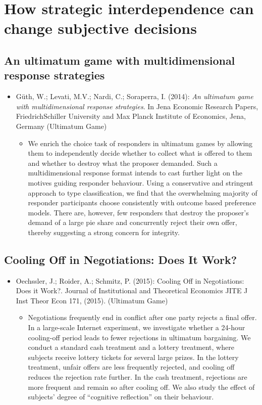 
\chapter{How strategic interdependence can change subjective decisions}

\section{An ultimatum game with multidimensional response strategies} 

\begin{itemize}
	\item Güth, W.; Levati, M.V.; Nardi, C.; Soraperra, I. (2014): \textit{An ultimatum game with multidimensional response strategies}. In Jena Economic Research Papers, FriedrichSchiller University and Max Planck Institute of Economics, Jena, Germany (Ultimatum Game)
		\begin{itemize}
			\item We enrich the choice task of responders in ultimatum games by allowing them to independently decide whether to collect what is offered to them and whether to destroy what the proposer demanded. Such a multidimensional response format intends to cast further light on the motives guiding responder behaviour. Using a conservative and stringent approach to type classification, we find that the overwhelming majority of responder participants choose consistently with outcome based preference models. There are, however, few responders that destroy the proposer's demand of a large pie share and concurrently reject their own offer, thereby suggesting a strong concern for integrity.
		\end{itemize}
\end{itemize}
\vspace{-0.5cm}
\section{Cooling Off in Negotiations: Does It Work?}

\begin{itemize}
	\item Oechssler, J.; Roider, A.; Schmitz, P. (2015): Cooling Off in Negotiations: Does it Work?. Journal of Institutional and Theoretical Economics JITE J Inst Theor Econ 171, (2015). (Ultimatum Game)
		\begin{itemize}
			\item Negotiations frequently end in conflict after one party rejects a final offer. In a large-scale Internet experiment, we investigate whether a 24-hour cooling-off period leads to fewer rejections in ultimatum bargaining. We conduct a standard cash treatment and a lottery treatment, where subjects receive lottery tickets for several large prizes. In the lottery treatment, unfair offers are less frequently rejected, and cooling off reduces the rejection rate further. In the cash treatment, rejections are more frequent and remain so after cooling off. We also study the effect of subjects’ degree of “cognitive reflection” on their behaviour.
		\end{itemize}
\end{itemize}

